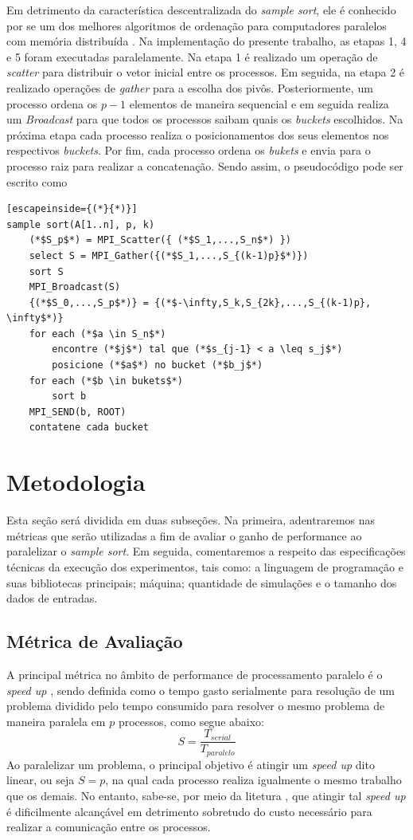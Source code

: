 \documentclass[letterpaper, 10 pt, conference]{ieeeconf}  %
\begin{document}
Em detrimento da característica descentralizada do \textit{sample sort}, ele é conhecido por se um dos melhores algoritmos de ordenação para computadores paralelos com memória distribuída \cite{c2}. Na implementação do presente trabalho, as etapas 1, 4 e 5 foram executadas paralelamente. Na etapa 1 é realizado um operação de \textit{scatter} para distribuir o vetor inicial entre os processos. Em seguida, na etapa 2 é realizado operações de \textit{gather} para a escolha dos pivôs. Posteriormente, um processo ordena os $p - 1$ elementos de maneira sequencial e em seguida realiza um \textit{Broadcast} para que todos os processos saibam quais os \textit{buckets} escolhidos. Na próxima etapa cada processo realiza o posicionamentos dos seus elementos nos respectivos \textit{buckets}. Por fim, cada processo ordena os \textit{bukets} e envia para o processo raiz para realizar a concatenação. Sendo assim, o pseudocódigo pode ser escrito como

\begin{lstlisting}[escapeinside={(*}{*)}]
sample sort(A[1..n], p, k)
    (*$S_p$*) = MPI_Scatter({ (*$S_1,...,S_n$*) })
    select S = MPI_Gather({(*$S_1,...,S_{(k-1)p}$*)})
    sort S
    MPI_Broadcast(S)
    {(*$S_0,...,S_p$*)} = {(*$-\infty,S_k,S_{2k},...,S_{(k-1)p}, \infty$*)}
    for each (*$a \in S_n$*)
        encontre (*$j$*) tal que (*$s_{j-1} < a \leq s_j$*)
        posicione (*$a$*) no bucket (*$b_j$*)
    for each (*$b \in bukets$*)
        sort b
    MPI_SEND(b, ROOT)
    contatene cada bucket
\end{lstlisting}

\section{Metodologia}
Esta seção será dividida em duas subseções. Na primeira, adentraremos nas métricas que serão utilizadas a fim de avaliar o ganho de performance ao paralelizar o \textit{sample sort}. Em seguida, comentaremos a respeito das especificações técnicas da execução dos experimentos, tais como: a linguagem de programação e suas bibliotecas principais; máquina; quantidade de simulações e o tamanho dos dados de entradas.
\subsection{Métrica de Avaliação}
A principal métrica no âmbito de performance de processamento paralelo é o \textit{speed up} \cite{c10}, sendo definida como o tempo gasto serialmente para resolução de um problema dividido pelo tempo consumido para resolver o mesmo problema de maneira paralela em $p$ processos, como segue abaixo:
$$ S = \frac{T_{serial}}{T_{paralelo}}$$
Ao paralelizar um problema, o principal objetivo é atingir um \textit{speed up} dito linear, ou seja $S = p$, na qual cada processo realiza igualmente o mesmo trabalho que os demais. No entanto, sabe-se, por meio da litetura \cite{c10}, que atingir tal \textit{speed up} é dificilmente alcançável em detrimento sobretudo do custo necessário para realizar a comunicação entre os processos.
\end{document}

